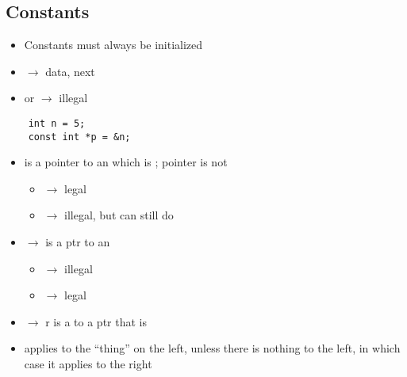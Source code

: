 \subsection{Constants}
\begin{itemize}
      \item Constants must always be initialized
      \item {} $ \rightarrow $  data,
             next
      \item {} or  $ \rightarrow $ illegal
\end{itemize}
\begin{lstlisting}
    int n = 5;
    const int *p = &n;
\end{lstlisting}
\begin{itemize}
      \item {} is a pointer to an  which is ; pointer
            is not 
            \begin{itemize}
                  \item {} $ \rightarrow $ legal
                  \item {} $ \rightarrow $ illegal, but can still do 
            \end{itemize}
      \item {} $ \rightarrow $  is a 
            ptr to an 
            \begin{itemize}
                  \item {} $ \rightarrow $ illegal
                  \item {} $ \rightarrow $ legal
            \end{itemize}
      \item {} $ \rightarrow $ r is a 
            to a ptr that is 
      \item {} applies to the ``thing'' on the left, unless there is
            nothing to the left, in which case it applies to the right
\end{itemize}

